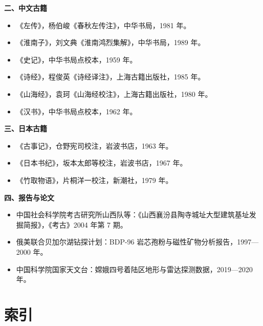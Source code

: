 \vspace{2mm}
\noindent\textbf{二、中文古籍}
\begin{itemize}[leftmargin=2em,itemsep=1pt,topsep=2pt]
\item 《左传》，杨伯峻《春秋左传注》，中华书局，1981 年。
\item 《淮南子》，刘文典《淮南鸿烈集解》，中华书局，1989 年。
\item 《史记》，中华书局点校本，1959 年。
\item 《诗经》，程俊英《诗经译注》，上海古籍出版社，1985 年。
\item 《山海经》，袁珂《山海经校注》，上海古籍出版社，1980 年。
\item 《汉书》，中华书局点校本，1962 年。
\end{itemize}

\vspace{2mm}
\noindent\textbf{三、日本古籍}
\begin{itemize}[leftmargin=2em,itemsep=1pt,topsep=2pt]
\item 《古事记》，仓野宪司校注，岩波书店，1963 年。
\item 《日本书纪》，坂本太郎等校注，岩波书店，1967 年。
\item 《竹取物语》，片桐洋一校注，新潮社，1979 年。
\end{itemize}

\vspace{2mm}
\noindent\textbf{四、报告与论文}
\begin{itemize}[leftmargin=2em,itemsep=1pt,topsep=2pt]
\item 中国社会科学院考古研究所山西队等：《山西襄汾县陶寺城址大型建筑基址发掘简报》，《考古》2004 年第 7 期。
\item 俄美联合贝加尔湖钻探计划：BDP-96 岩芯孢粉与磁性矿物分析报告，1997—2000 年。
\item 中国科学院国家天文台：嫦娥四号着陆区地形与雷达探测数据，2019—2020 年。
\end{itemize}
\endgroup

\clearpage

\chapter*{索\quad 引}
{}

\begingroup
\footnotesize
\linespread{1.3}\selectfont
\newcommand{\idx}[2]{\hangindent=1.4em \noindent #1\dotfill #2\par}

